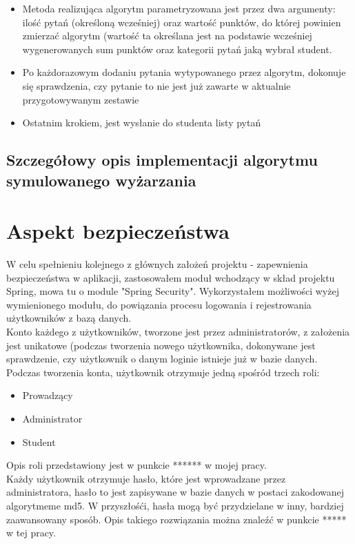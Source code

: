 \documentclass[a4paper, titlepage]{article}
\begin{document}
\begin{itemize}
\begin{itemize}
	\begin{itemize}
	\item Metoda realizująca algorytm parametryzowana jest przez dwa argumenty: ilość pytań (określoną wcześniej) oraz wartość punktów, do której powinien zmierzać algorytm (wartość ta określana jest na podstawie wcześniej wygenerowanych sum punktów oraz kategorii pytań jaką wybrał student.
			\item Po każdorazowym dodaniu pytania wytypowanego przez algorytm, dokonuje się sprawdzenia, czy pytanie to nie jest już zawarte w aktualnie przygotowywanym zestawie
			\item Ostatnim krokiem, jest wysłanie do studenta listy pytań
			\end{itemize}
			\end{itemize}
			\subsection{Szczegółowy opis implementacji algorytmu symulowanego wyżarzania}
			\section{Aspekt bezpieczeństwa}
			W celu spełnieniu kolejnego z głównych założeń projektu - zapewnienia bezpieczeństwa w aplikacji, zastosowałem moduł wchodzący w skład projektu Spring, mowa tu o module "Spring Security". Wykorzystałem możliwości wyżej wymienionego modułu, do powiązania procesu logowania i rejestrowania użytkowników z bazą danych. 
			\\ Konto każdego z użytkowników, tworzone jest przez administratorów, z założenia jest unikatowe (podczas tworzenia nowego użytkownika, dokonywane jest sprawdzenie, czy użytkownik o danym loginie istnieje już w bazie danych. Podczas tworzenia konta, użytkownik otrzymuje jedną spośród trzech roli:
				\begin{itemize}
				\item Prowadzący
				\item Administrator
				\item Student
				\end{itemize}
				Opis roli przedstawiony jest w punkcie ****** w mojej pracy.
				\\ Każdy użytkownik otrzymuje hasło, które jest wprowadzane przez administratora, hasło to jest zapisywane w bazie danych w postaci zakodowanej algorytmeme md5. W przyszłośći, hasła mogą być przydzielane w inny, bardziej zaawansowany sposób. Opis takiego rozwiązania można znaleźć w punkcie ***** w tej pracy.

				\end{itemize}
\end{document}
